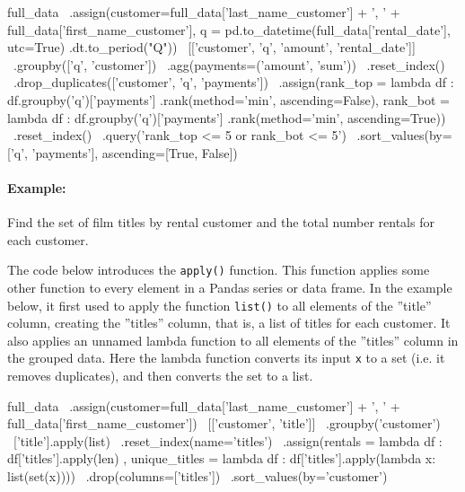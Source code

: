 \begin{samepage}
\begin{pythoncode}
full_data \
   .assign(customer=full_data['last_name_customer'] + ', ' + 
                    full_data['first_name_customer'],
           q = pd.to_datetime(full_data['rental_date'], utc=True)
                 .dt.to_period("Q"))  \
   [['customer', 'q', 'amount', 'rental_date']] \
   .groupby(['q', 'customer']) \
   .agg(payments=('amount', 'sum')) \
   .reset_index() \
   .drop_duplicates(['customer', 'q', 'payments']) \
   .assign(rank_top = lambda df : 
              df.groupby('q')['payments']
                .rank(method='min', ascending=False),
           rank_bot = lambda df : 
              df.groupby('q')['payments']
              .rank(method='min', ascending=True)) \
    .reset_index() \
    .query('rank_top <= 5 or rank_bot <= 5') \
    .sort_values(by=['q', 'payments'], ascending=[True, False]) 
\end{pythoncode}
\end{samepage}

\paragraph*{Example:} Find the set of film titles by rental customer and the total number rentals for each customer.

The code below introduces the \texttt{apply()} function. This function applies some other function to every element in a Pandas series or data frame. In the example below, it first used to apply the function \texttt{list()} to all elements of the ''title'' column, creating the ''titles'' column, that is, a list of titles for each customer. It also applies an unnamed lambda function to all elements of the ''titles'' column in the grouped data. Here the lambda function converts its input \texttt{x} to a set (i.e. it removes duplicates), and then converts the set to a list.

\begin{samepage}
\begin{pythoncode}
full_data \
   .assign(customer=full_data['last_name_customer'] + ', ' + 
                    full_data['first_name_customer']) \
   [['customer', 'title']] \
   .groupby('customer') \
   ['title'].apply(list) \
   .reset_index(name='titles') \
   .assign(rentals = lambda df :
              df['titles'].apply(len) ,
           unique_titles = lambda df :
              df['titles'].apply(lambda x: list(set(x)))) \
   .drop(columns=['titles']) \
   .sort_values(by='customer')
\end{pythoncode}
\end{samepage}

